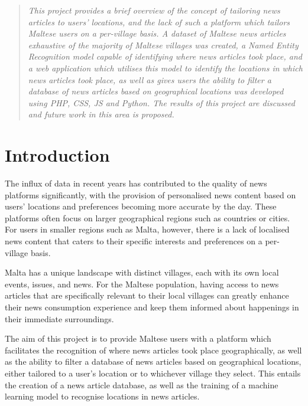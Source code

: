 \documentclass[a4paper, oneside, 11pt]{article}
\begin{document}
\begin{multicols*}{2}

  \begin{abstract}
    \textit{
      This project provides a brief overview of the concept of tailoring news articles to users' locations, and the lack of such a platform which tailors Maltese users on a per-village basis. A dataset of Maltese news articles exhaustive of the majority of Maltese villages was created, a Named Entity Recognition model capable of identifying where news articles took place, and a web application which utilises this model to identify the locations in which news articles took place, as well as gives users the ability to filter a database of news articles based on geographical locations was developed using PHP, CSS, JS and Python. The results of this project are discussed and future work in this area is proposed.
    }
  \end{abstract}


  \section{Introduction}

  The influx of data in recent years has contributed to the quality of news platforms significantly, with the provision of personalised news content based on users' locations and preferences becoming more accurate by the day. These platforms often focus on larger geographical regions such as countries or cities. For users in smaller regions such as Malta, however, there is a lack of localised news content that caters to their specific interests and preferences on a per-village basis.

  Malta has a unique landscape with distinct villages, each with its own local events, issues, and news. For the Maltese population, having access to news articles that are specifically relevant to their local villages can greatly enhance their news consumption experience and keep them informed about happenings in their immediate surroundings.

  The aim of this project is to provide Maltese users with a platform which facilitates the recognition of where news articles took place geographically, as well as the ability to filter a database of news articles based on geographical locations, either tailored to a user's location or to whichever village they select. This entails the creation of a news article database, as well as the training of a machine learning model to recognise locations in news articles.


\end{multicols*}
\end{document}
